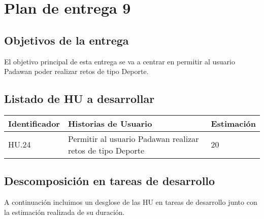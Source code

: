 \section{Plan de entrega 9}

\subsection{Objetivos de la entrega}

El objetivo principal de esta entrega se va a centrar en permitir al usuario Padawan poder realizar retos de tipo Deporte.

\subsection{Listado de HU a desarrollar}

\begin{table}[h]
	\centering
	\begin{tabular}{| p{2.3cm} | p{6.7cm} | p{2cm} |}
		\rowcolor[HTML]{329A9D} 
		{\color[HTML]{FFFFFF} \textbf{Identificador}} & {\color[HTML]{FFFFFF} \textbf{Historias de Usuario}} & {\color[HTML]{FFFFFF} \textbf{Estimación}}  \\ \hline
		HU.24 & Permitir al usuario Padawan realizar retos de tipo Deporte & 20 \\ \hline
	\end{tabular}
\end{table}

\newpage

\subsection{Descomposición en tareas de desarrollo}

A continuación incluimos un desglose de las HU en tareas de desarrollo junto con la estimación realizada de su duración.\\

